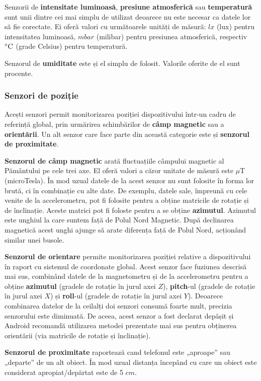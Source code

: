 \documentclass[12pt,a4paper]{article}
\begin{document}
Senzorii de \textbf{intensitate luminoasă}, \textbf{presiune atmosferică} sau \textbf{temperatură} sunt unii dintre cei mai simplu de utilizat deoarece nu este necesar ca datele lor să fie corectate. Ei oferă valori cu următoarele unități de măsură: $lx$ (lux) pentru intensitatea luminoasă, $mbar$ (milibar) pentru presiunea atmosferică, respectiv $\celsius$ (grade Celsius) pentru temperatură.

Senzorul de \textbf{umiditate} este și el simplu de folosit. Valorile oferite de el sunt procente.


\subsubsection{Senzori de poziție}
Acești senzori permit monitorizarea poziției dispozitivului într-un cadru de referință global, prin urmărirea schimbărilor de \textbf{câmp magnetic} sau a \textbf{orientării}. Un alt senzor care face parte din această categorie este și  \textbf{senzorul de proximitate}.

\textbf{Senzorul de câmp magnetic} arată fluctuațiile câmpului magnetic al Pământului pe cele trei axe. El oferă valori a căror unitate de măsură este $\mu$T (microTesla). În mod uzual datele de la acest senzor nu sunt folosite în forma lor brută, ci în combinație cu alte date. De exemplu, datele sale, împreună cu cele venite de la accelerometru, pot fi folosite pentru a obține matricile de rotație și de înclinație. Aceste matrici pot fi foloste pentru a se obține \textbf{azimutul}. Azimutul este unghiul la care suntem față de Polul Nord Magnetic. După declinarea magnetică acest unghi ajunge să arate diferența față de Polul Nord, acționând similar unei busole.

\textbf{Senzorul de orientare} permite monitorizarea poziției relative a dispozitivului în raport cu sistemul de coordonate global. Acest senzor face fuziunea descrisă mai sus, combinând datele de la magnetometru și de la accelerometru pentru a obține \textbf{azimutul} (gradele de rotație în jurul axei $Z$), \textbf{pitch}-ul (gradele de rotație în jurul axei $X$) și \textbf{roll}-ul (gradele de rotație în jurul axei $Y$). Deoarece combinarea datelor de la ceilalți doi senzori consumă foarte mult, precizia senzorului este diminuată. De aceea, acest senzor a fost declarat depășit și Android recomandă utilizarea metodei prezentate mai sus pentru obținerea orientării (via matricile de rotație și înclinație).

\textbf{Senzorul de proximitate} raportează cand telefonul este „aproape” sau „departe” de un alt obiect. În mod uzual distanța începând cu care un obiect este considerat apropiat/depărtat este de 5 $cm$.
\end{document}
